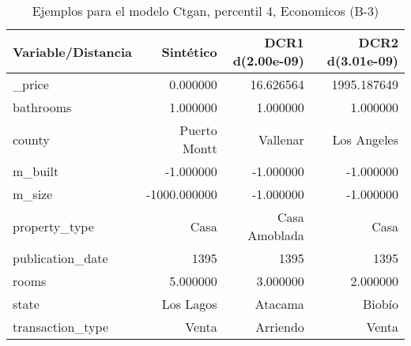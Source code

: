 \begin{table}[H]
\centering
\fontsize{10}{14}\selectfont
\caption{Ejemplos para el modelo Ctgan, percentil 4, Economicos (B-3)}
\label{table-example-economicos-b-3-ctgan-4p}
\begin{tabular}{|l|r|r|r|}
\hline
\rowcolor[gray]{0.8}
Variable/Distancia & Sintético & DCR1 d(2.00e-09) & DCR2 d(3.01e-09) \\
\hline \_price & \cellcolor[rgb]{0.9, 0.54, 0.52} 0.000000 & 16.626564 & 1995.187649 \\
\hline bathrooms & \cellcolor[rgb]{0.9, 0.54, 0.52} 1.000000 & \cellcolor[rgb]{0.9, 0.54, 0.52} 1.000000 & \cellcolor[rgb]{0.9, 0.54, 0.52} 1.000000 \\
\hline county & \cellcolor[rgb]{0.9, 0.54, 0.52} Puerto Montt & Vallenar & Los Angeles \\
\hline m\_built & \cellcolor[rgb]{0.9, 0.54, 0.52} -1.000000 & \cellcolor[rgb]{0.9, 0.54, 0.52} -1.000000 & \cellcolor[rgb]{0.9, 0.54, 0.52} -1.000000 \\
\hline m\_size & \cellcolor[rgb]{0.9, 0.54, 0.52} -1000.000000 & \cellcolor[rgb]{0.9, 0.54, 0.52} -1.000000 & \cellcolor[rgb]{0.9, 0.54, 0.52} -1.000000 \\
\hline property\_type & \cellcolor[rgb]{0.9, 0.54, 0.52} Casa & Casa Amoblada & \cellcolor[rgb]{0.9, 0.54, 0.52} Casa \\
\hline publication\_date & \cellcolor[rgb]{0.9, 0.54, 0.52} 1395 & \cellcolor[rgb]{0.9, 0.54, 0.52} 1395 & \cellcolor[rgb]{0.9, 0.54, 0.52} 1395 \\
\hline rooms & \cellcolor[rgb]{0.9, 0.54, 0.52} 5.000000 & 3.000000 & 2.000000 \\
\hline state & \cellcolor[rgb]{0.9, 0.54, 0.52} Los Lagos & Atacama & Biobío \\
\hline transaction\_type & \cellcolor[rgb]{0.9, 0.54, 0.52} Venta & Arriendo & \cellcolor[rgb]{0.9, 0.54, 0.52} Venta \\
\hline
\end{tabular}
\end{table}
